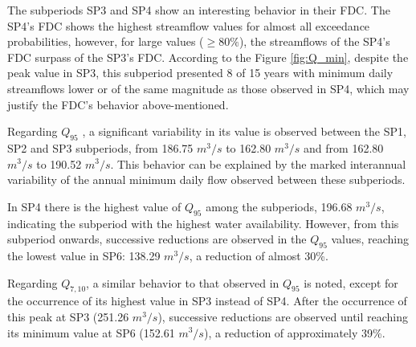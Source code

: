         The subperiods SP3 and SP4 show an interesting behavior in their FDC. The SP4's FDC shows the highest streamflow values for almost all exceedance probabilities, however, for large values ($\geq 80\%$), the streamflows of the SP4's FDC surpass of the SP3's FDC. According to the Figure \ref{fig:Q_min}, despite the peak value in SP3, this subperiod presented 8 of 15 years with minimum daily streamflows lower or of the same magnitude as those observed in SP4, which may justify the FDC's behavior above-mentioned.
        
        Regarding $Q_{95}$ , a significant variability in its value is observed between the SP1, SP2 and SP3 subperiods, from 186.75 $m^{3}/s$ to 162.80 $m^{3}/s$ and from 162.80 $m^{3}/s$ to 190.52 $m^{3}/s$. This behavior can be explained by the marked interannual variability of the annual minimum daily flow observed between these subperiods.

        In SP4 there is the highest value of $Q_{95}$  among the subperiods, 196.68 $m^{3}/s$, indicating the subperiod with the highest water availability. However, from this subperiod onwards, successive reductions are observed in the $Q_{95}$ values, reaching the lowest value in SP6: 138.29 $m^{3}/s$, a reduction of almost 30\%.

        Regarding $Q_{7,10}$, a similar behavior to that observed in $Q_{95}$ is noted, except for the occurrence of its highest value in SP3 instead of SP4. After the occurrence of this peak at SP3 (251.26 $m^{3}/s$), successive reductions are observed until reaching its minimum value at SP6 (152.61 $m^{3}/s$), a reduction of approximately 39\%.
        


        
